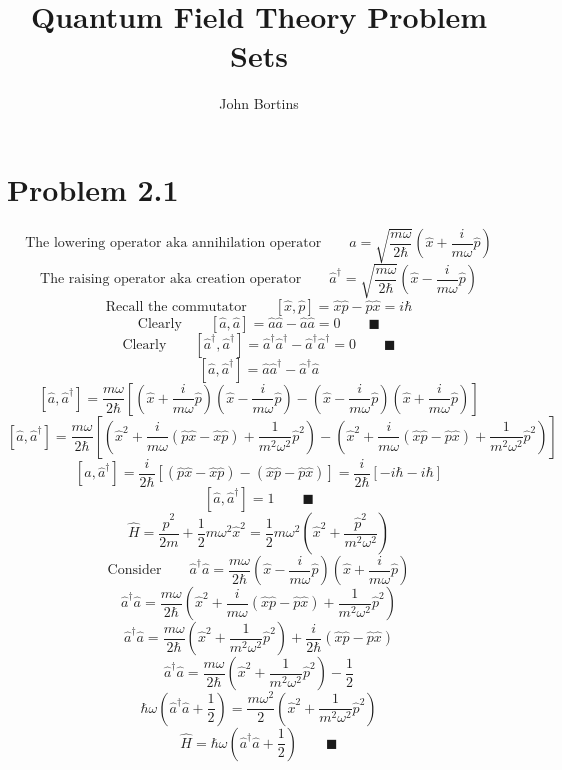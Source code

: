 \documentclass{amsart}
\title{Quantum Field Theory Problem Sets}
\author{John Bortins}
\begin{document}
 
\maketitle{}
 
\section*{Problem 2.1}

\[\text{The lowering operator aka annihilation operator}\qquad\hat{a}  = \sqrt{\frac{m\omega}{2\hbar}}\left(\hat{x} + \frac{i}{m\omega}\hat{p}\right)  \]
\[\text{The raising operator aka creation operator}\qquad\hat{a}^\dagger  = \sqrt{\frac{m\omega}{2\hbar}}\left(\hat{x} - \frac{i}{m\omega}\hat{p}\right)  \]
\[\text{Recall the commutator}\qquad[\hat{x},\hat{p}]  = \hat{x}\hat{p}-\hat{p}\hat{x}=i\hbar \]
\[\text{Clearly}\qquad [\hat{a},\hat{a}]  = \hat{a}\hat{a}-\hat{a}\hat{a}=0 \qquad \blacksquare \]
\[\text{Clearly}\qquad [\hat{a}^\dagger,\hat{a}^\dagger]  = \hat{a}^\dagger\hat{a}^\dagger-\hat{a}^\dagger\hat{a}^\dagger=0 \qquad \blacksquare \]
\[ [\hat{a},\hat{a}^\dagger]  = \hat{a}\hat{a}^\dagger-\hat{a}^\dagger\hat{a}\]
\[ [\hat{a},\hat{a}^\dagger]  = \frac{m\omega}{2\hbar}\left[\left(\hat{x} + \frac{i}{m\omega}\hat{p}\right)\left(\hat{x} - \frac{i}{m\omega}\hat{p}\right)-\left(\hat{x} - \frac{i}{m\omega}\hat{p}\right)\left(\hat{x} + \frac{i}{m\omega}\hat{p}\right)\right]\]
\[ [\hat{a},\hat{a}^\dagger]  = \frac{m\omega}{2\hbar}\left[\left(\hat{x}^2 + \frac{i}{m\omega}(\hat{p}\hat{x}-\hat{x}\hat{p}) + \frac{1}{m^2\omega^2}\hat{p}^2\right)-\left(\hat{x}^2 + \frac{i}{m\omega}(\hat{x}\hat{p}-\hat{p}\hat{x}) + \frac{1}{m^2\omega^2}\hat{p}^2\right)\right]\]
\[ [\hat{a},\hat{a}^\dagger]  = \frac{i}{2\hbar}\left[ (\hat{p}\hat{x}-\hat{x}\hat{p}) - (\hat{x}\hat{p}-\hat{p}\hat{x})\right]= \frac{i}{2\hbar}\left[-i\hbar-i\hbar\right]\]
\[ [\hat{a},\hat{a}^\dagger]  = 1 \qquad\blacksquare\]
\[\hat{H}=\frac{\hat{p}^2}{2m}+\frac{1}{2}m\omega^2\hat{x}^2=\frac{1}{2}m\omega^2\left(\hat{x}^2+\frac{\hat{p}^2}{m^2\omega^2}\right) \]
\[\text{Consider}\qquad \hat{a}^\dagger \hat{a} =\frac{m\omega}{2\hbar}\left(\hat{x} - \frac{i}{m\omega}\hat{p}\right)\left(\hat{x} + \frac{i}{m\omega}\hat{p}\right)  \]
\[\hat{a}^\dagger \hat{a} =\frac{m\omega}{2\hbar}\left(\hat{x}^2 + \frac{i}{m\omega}(\hat{x}\hat{p}-\hat{p}\hat{x}) + \frac{1}{m^2\omega^2}\hat{p}^2\right)  \]
\[\hat{a}^\dagger \hat{a} =\frac{m\omega}{2\hbar}\left(\hat{x}^2 + \frac{1}{m^2\omega^2}\hat{p}^2\right) + \frac{i}{2\hbar}(\hat{x}\hat{p}-\hat{p}\hat{x}) \]
\[\hat{a}^\dagger \hat{a} =\frac{m\omega}{2\hbar}\left(\hat{x}^2 + \frac{1}{m^2\omega^2}\hat{p}^2\right) - \frac{1}{2} \]
\[\hbar\omega\left(\hat{a}^\dagger \hat{a} +\frac{1}{2}\right)=\frac{m\omega^2}{2}\left(\hat{x}^2 + \frac{1}{m^2\omega^2}\hat{p}^2\right)   \]
\[\hat{H}=\hbar\omega\left(\hat{a}^\dagger \hat{a} +\frac{1}{2}\right)\qquad\blacksquare \]
\end{document}
